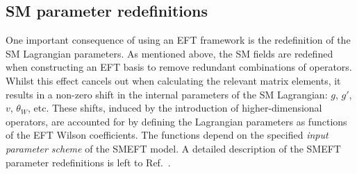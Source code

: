 \subsection{SM parameter redefinitions}
One important consequence of using an EFT framework is the redefinition of the SM Lagrangian parameters. As mentioned above, the SM fields are redefined when constructing an EFT basis to remove redundant combinations of operators. Whilst this effect cancels out when calculating the relevant matrix elements, it results in a non-zero shift in the internal parameters of the SM Lagrangian: $g$, $g'$, $v$, $\theta_W$, etc. These shifts, induced by the introduction of higher-dimensional operators, are accounted for by defining the Lagrangian parameters as functions of the EFT Wilson coefficients. The functions depend on the specified \textit{input parameter scheme} of the SMEFT model. A detailed description of the SMEFT parameter redefinitions is left to Ref.~\cite{Brivio:2017btx}.